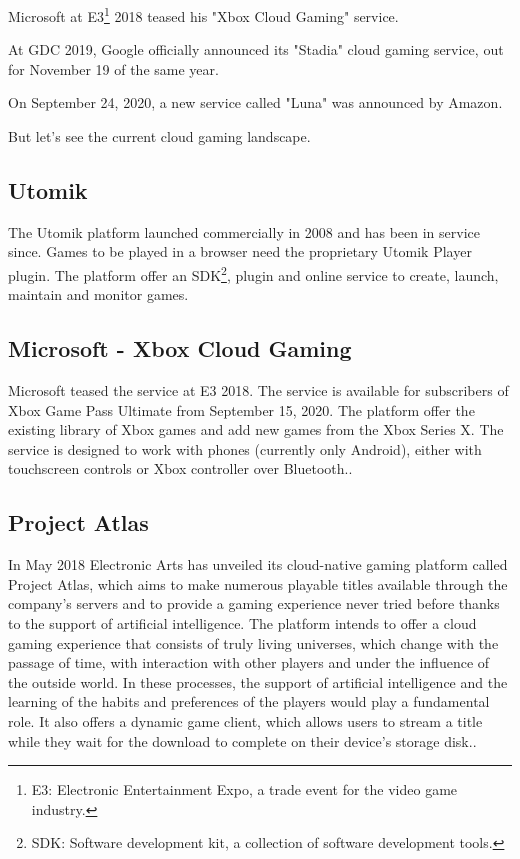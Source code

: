 Microsoft at E3\footnote{E3: Electronic Entertainment Expo, a trade event for the video game industry.} 2018 teased his "Xbox Cloud Gaming" service.

At GDC 2019, Google officially announced its "Stadia" cloud gaming service, out for November 19 of the same year.

On September 24, 2020, a new service called "Luna" was announced by Amazon\cite{Cloud_gaming_history}.

But let's see the current cloud gaming landscape.

\subsection{Utomik}
The Utomik platform launched commercially in 2008 and has been in service since. Games to be played in a browser need the proprietary Utomik Player plugin. The platform offer an SDK\footnote{SDK: Software development kit, a collection of software development tools.}, plugin and online service to create, launch, maintain and monitor games\cite{Utomik}.

\subsection{Microsoft - Xbox Cloud Gaming}
Microsoft teased the service at E3 2018. The service is available for subscribers of Xbox Game Pass Ultimate from September 15, 2020. The platform offer the existing library of Xbox games and add new games from the Xbox Series X. The service is designed to work with phones (currently only Android), either with touchscreen controls or Xbox controller over Bluetooth.\cite{Xbox_Game_Pass_cloud_gaming}.

\subsection{Project Atlas}
In May 2018 Electronic Arts has unveiled its cloud-native gaming platform called Project Atlas, which aims to make numerous playable titles available through the company's servers and to provide a gaming experience never tried before thanks to the support of artificial intelligence. The platform intends to offer a cloud gaming experience that consists of truly living universes, which change with the passage of time, with interaction with other players and under the influence of the outside world. In these processes, the support of artificial intelligence and the learning of the habits and preferences of the players would play a fundamental role. It also offers a dynamic game client, which allows users to stream a title while they wait for the download to complete on their device's storage disk.\cite{Project_Atlas}.

